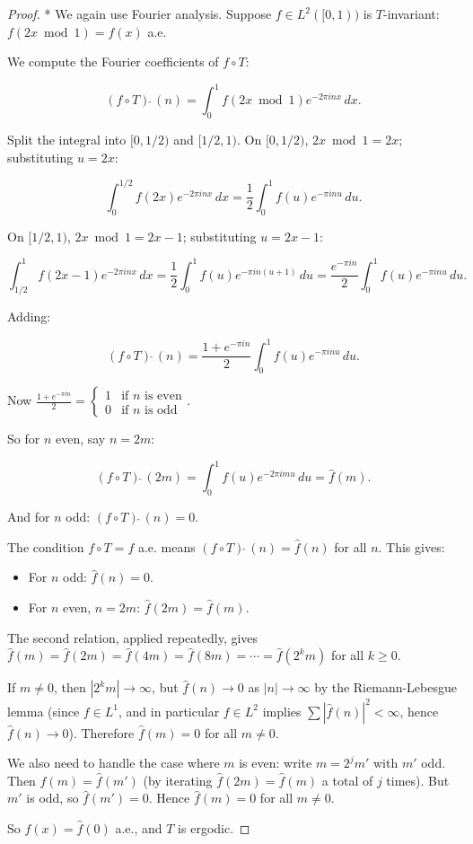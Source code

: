 \begin{proof}
* We again use Fourier analysis. Suppose $f \in L^2([0,1))$ is $T$-invariant: $f(2x \bmod 1) = f(x)$ a.e.

We compute the Fourier coefficients of $f \circ T$:

\[
(f \circ T)\hat{\;}(n) = \int_0^1 f(2x \bmod 1) e^{-2\pi i n x} \, dx.
\]

Split the integral into $[0, 1/2)$ and $[1/2, 1)$. On $[0, 1/2)$, $2x \bmod 1 = 2x$; substituting $u = 2x$:

\[
\int_0^{1/2} f(2x) e^{-2\pi i n x} \, dx = \frac{1}{2} \int_0^1 f(u) e^{-\pi i n u} \, du.
\]

On $[1/2, 1)$, $2x \bmod 1 = 2x - 1$; substituting $u = 2x - 1$:

\[
\int_{1/2}^1 f(2x - 1) e^{-2\pi i n x} \, dx = \frac{1}{2} \int_0^1 f(u) e^{-\pi i n (u+1)} \, du = \frac{e^{-\pi i n}}{2} \int_0^1 f(u) e^{-\pi i n u} \, du.
\]

Adding:

\[
(f \circ T)\hat{\;}(n) = \frac{1 + e^{-\pi i n}}{2} \int_0^1 f(u) e^{-\pi i n u} \, du.
\]

Now $\frac{1 + e^{-\pi i n}}{2} = \begin{cases} 1 & \text{if } n \text{ is even} \\ 0 & \text{if } n \text{ is odd}\end{cases}$.

So for $n$ even, say $n = 2m$:

\[
(f \circ T)\hat{\;}(2m) = \int_0^1 f(u) e^{-2\pi i m u} \, du = \hat{f}(m).
\]

And for $n$ odd: $(f \circ T)\hat{\;}(n) = 0$.

The condition $f \circ T = f$ a.e. means $(f \circ T)\hat{\;}(n) = \hat{f}(n)$ for all $n$. This gives:

\begin{itemize}[nosep]
  \item For $n$ odd: $\hat{f}(n) = 0$.
  \item For $n$ even, $n = 2m$: $\hat{f}(2m) = \hat{f}(m)$.
\end{itemize}

The second relation, applied repeatedly, gives $\hat{f}(m) = \hat{f}(2m) = \hat{f}(4m) = \hat{f}(8m) = \cdots = \hat{f}(2^k m)$ for all $k \geq 0$.

If $m \neq 0$, then $|2^k m| \to \infty$, but $\hat{f}(n) \to 0$ as $|n| \to \infty$ by the Riemann-Lebesgue lemma (since $f \in L^1$, and in particular $f \in L^2$ implies $\sum |\hat{f}(n)|^2 < \infty$, hence $\hat{f}(n) \to 0$). Therefore $\hat{f}(m) = 0$ for all $m \neq 0$.

We also need to handle the case where $m$ is even: write $m = 2^j m'$ with $m'$ odd. Then $\hat{f}(m) = \hat{f}(m')$ (by iterating $\hat{f}(2m) = \hat{f}(m)$ a total of $j$ times). But $m'$ is odd, so $\hat{f}(m') = 0$. Hence $\hat{f}(m) = 0$ for all $m \neq 0$.

So $f(x) = \hat{f}(0)$ a.e., and $T$ is ergodic.
\end{proof}



